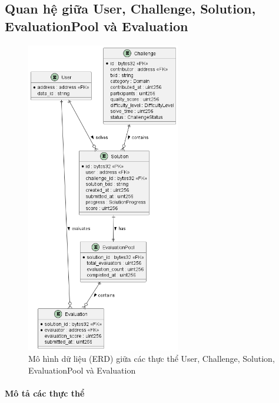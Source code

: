\subsection{Quan hệ giữa User, Challenge, Solution, EvaluationPool và Evaluation}

  \begin{figure}[H]
    \centering
    \includegraphics[width=0.6\textwidth]{../images/ERD-sub2.png}
    \caption{Mô hình dữ liệu (ERD) giữa các thực thể User, Challenge, Solution, EvaluationPool và Evaluation}
    \label{fig:erd-sub2}
  \end{figure}

  \paragraph{Mô tả các thực thể}

